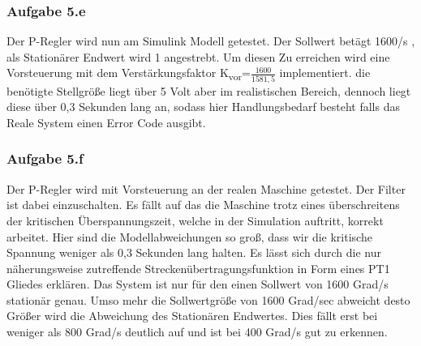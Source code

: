 \documentclass[10pt]{scrartcl}
\begin{document}
\subsubsection{Aufgabe 5.e}	
Der P-Regler wird nun am Simulink Modell getestet. Der Sollwert betägt 1600\textdegree/s , als Stationärer Endwert wird 1 angestrebt. Um diesen Zu erreichen wird eine Vorsteuerung mit dem Verstärkungsfaktor  K\textsubscript{vor}=$\frac{1600}{1581,5}$ implementiert.
 die benötigte Stellgröße liegt über 5 Volt aber im realistischen Bereich, dennoch liegt diese über 0,3 Sekunden lang an, sodass hier Handlungsbedarf besteht falls das Reale System einen Error Code ausgibt.\\
\subsubsection{Aufgabe 5.f}	
Der P-Regler wird mit Vorsteuerung an der realen Maschine getestet. Der Filter ist dabei einzuschalten. Es fällt auf das die Maschine trotz eines überschreitens der kritischen Überspannungszeit, welche in der Simulation auftritt, korrekt arbeitet. Hier sind die Modellabweichungen so groß, dass wir die kritische Spannung weniger als 0,3 Sekunden  lang halten. Es lässt sich durch die nur näherungsweise zutreffende Streckenübertragungsfunktion in Form eines PT1 Gliedes erklären. Das System ist nur für den einen Sollwert von 1600 Grad/s stationär genau. Umso mehr die Sollwertgröße von 1600 Grad/sec abweicht desto Größer wird die Abweichung des Stationären Endwertes. Dies fällt erst bei weniger als 800 Grad/s deutlich auf und ist bei 400 Grad/s gut zu erkennen.\\
\end{document}
